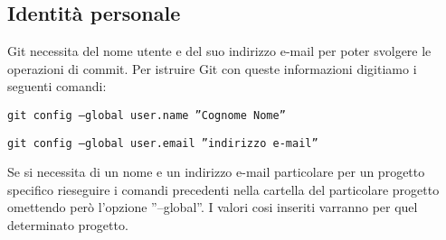 \subsection{Identità personale}
Git necessita del nome utente e del suo indirizzo e-mail per poter svolgere le operazioni di commit. Per istruire Git con queste informazioni digitiamo i seguenti comandi:

\begin{center}
\texttt{git config --global user.name ''Cognome Nome''}

\texttt{git config --global user.email ''indirizzo e-mail''}
\end{center}

Se si necessita di un nome e un indirizzo e-mail particolare per un progetto specifico rieseguire i comandi precedenti nella cartella del particolare progetto omettendo però l'opzione ''--global''. I valori cosi inseriti varranno per quel determinato progetto.